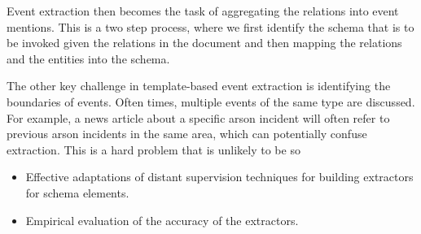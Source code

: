 Event extraction then becomes the task of aggregating the relations into event mentions. This is a two step process, where we first identify the schema that is to be invoked given the relations in the document and then mapping the relations and the entities into the schema. 


The other key challenge in template-based event extraction is identifying the boundaries of events. Often times, multiple events of the same type are discussed. For example, a news article about a specific arson incident will often refer to previous arson incidents in the same area, which can potentially confuse extraction. This is a hard problem that is unlikely to be so




\begin{itemize}
\item Effective adaptations of distant supervision techniques for building extractors for schema elements.
\item Empirical evaluation of the accuracy of the extractors. 
\end{itemize}

